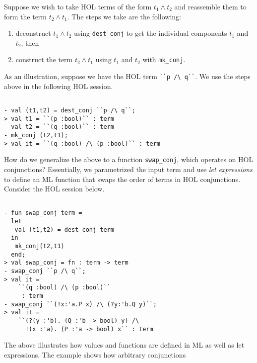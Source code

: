 \begin{example}
  Suppose we wish to take HOL terms of the form $t_1 \wedge t_2$ and
  reassemble them to form the term $t_2 \wedge t_1$.  The steps we
  take are the following:
  \begin{enumerate}
  \item deconstruct $t_1 \wedge t_2$ using \small{\verb|dest_conj|} to
    get the individual components $t_1$ and $t_2$, then
  \item construct the term $t_2 \wedge t_1$ using $t_1$ and $t_2$ with
    \small{\verb|mk_conj|}.
  \end{enumerate}

  As an illustration, suppose we have the HOL term
  \small{\verb|``p /\ q``|}. We use the steps above in the following
  HOL session.
  \begin{session}
    \label{session:term9}
\begin{verbatim}

- val (t1,t2) = dest_conj ``p /\ q``;
> val t1 = ``(p :bool)`` : term
  val t2 = ``(q :bool)`` : term
- mk_conj (t2,t1);
> val it = ``(q :bool) /\ (p :bool)`` : term
\end{verbatim}
  \end{session}

  How do we generalize the above to a function
  \small{\verb|swap_conj|}, which operates on HOL conjunctions?
  Essentially, we parametrized the input term and use \emph{let
    expressions} to define an ML function that swaps the order of
  terms in HOL conjunctions. Consider the HOL session below.
  \begin{session}
\begin{verbatim}

- fun swap_conj term =
  let
   val (t1,t2) = dest_conj term
  in
   mk_conj(t2,t1)
  end;
> val swap_conj = fn : term -> term
- swap_conj ``p /\ q``;
> val it =
    ``(q :bool) /\ (p :bool)``
     : term
- swap_conj ``(!x:'a.P x) /\ (?y:'b.Q y)``;
> val it =
    ``(?(y :'b). (Q :'b -> bool) y) /\ 
      !(x :'a). (P :'a -> bool) x`` : term
\end{verbatim}
  \end{session}

  The above illustrates how values and functions are defined in ML as
  well as let expressions. The example shows how arbitrary
  conjunctions
\end{example}

